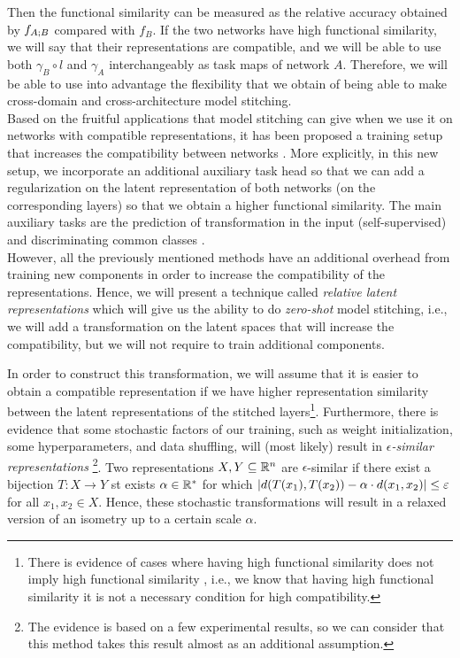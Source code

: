 \documentclass[../main.tex]{subfiles}
\begin{document}
Then the functional similarity can be measured as the relative accuracy obtained by $f_{A \mathbin{;} B}$ compared with $f_B$. If the two networks have high functional similarity, we will say that their representations are compatible, and we will be able to use both $\gamma_B \circ l$ and $\gamma_A$ interchangeably as task maps of network $A$. Therefore, we will be able to use into advantage the flexibility that we obtain of being able to make cross-domain and cross-architecture model stitching.\\

Based on the fruitful applications that model stitching can give when we use it on networks with compatible representations, it has been proposed a training setup that increases the compatibility between networks \cite{gygli_towards_2020}. More explicitly, in this new setup, we incorporate an additional auxiliary task head so that we can add a regularization on the latent representation of both networks (on the corresponding layers) so that we obtain a higher functional similarity. The main auxiliary tasks are the prediction of transformation in the input (self-supervised) and discriminating common classes \cite{gygli_towards_2020}.\\

However, all the previously mentioned methods have an additional overhead from training new components in order to increase the compatibility of the representations. Hence, we will present a technique called \emph{relative latent representations} which will give us the ability to do \emph{zero-shot} model stitching, i.e., we will add a transformation on the latent spaces that will increase the compatibility, but we will not require to train additional components. 

In order to construct this transformation, we will assume that it is easier to obtain a compatible representation if we have higher representation similarity between the latent representations of the stitched layers\footnote{There is evidence of cases where having high functional similarity does not imply high functional similarity \cite{csiszarik_similarity_2021}, i.e., we know that having high functional similarity it is not a necessary condition for high compatibility.}. Furthermore, there is evidence that some stochastic factors of our training, such as weight initialization, some hyperparameters, and data shuffling, will (most likely) result in \emph{$\epsilon$-similar representations} \cite{moschella_relative_2022}\footnote{The evidence is based on a few experimental results, so we can consider that this method takes this result almost as an additional assumption.}. Two representations $X,Y \subseteq \mathbb{R}^n$ are $\epsilon$-similar if there exist a bijection $T:X \to Y$ st exists $\alpha \in \mathbb{R}^*$ for which $\left\lvert d(T(x_1), T(x_2)) - \alpha \cdot d(x_1,x_2) \right\rvert \leq \varepsilon$ for all $x_1,x_2 \in X$. Hence, these stochastic transformations will result in a relaxed version of an isometry up to a certain scale $\alpha$.\\
\end{document}
